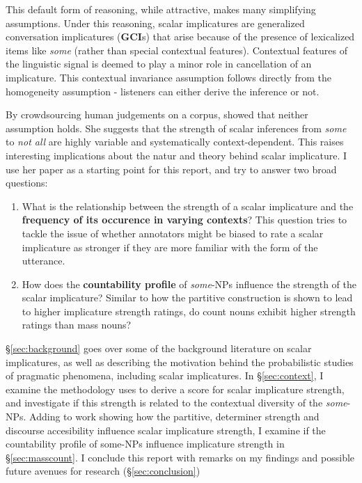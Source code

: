 \documentclass[10pt, biblatex, linguex]{report}
\begin{document}
This default form of reasoning, while attractive, makes many simplifying
assumptions. Under this reasoning, scalar implicatures are generalized
conversation implicatures (\textbf{GCI}s) that arise because of the presence of
lexicalized items like \textit{some} (rather than special contextual features).
Contextual features of the linguistic signal is
deemed to play a minor role in cancellation of an implicature. This {\rmsc
contextual invariance} assumption follows directly from the {\rmsc homogeneity}
assumption - listeners can either derive the inference or not.


By crowdsourcing human judgements on a corpus, \citet{degen_investigating_2015}
showed that neither assumption holds. She
suggests that the strength of scalar inferences from \textit{some} to
\textit{not all} are highly variable and systematically context-dependent. This
raises interesting implications about the natur and theory behind scalar
implicature. I use her paper as a starting point for this report, and try to
answer two broad questions:

\begin{enumerate}
    \item What is the relationship between the strength of a scalar implicature
          and the \textbf{frequency of its occurence in varying contexts}? This question
          tries to tackle the issue of whether annotators might be biased to
          rate a scalar implicature as stronger if they are more familiar with
          the form of the utterance.
    \item How does the \textbf{countability profile} of \textit{some}-NPs influence
          the strength of the scalar implicature? Similar to how the partitive
          construction is shown to lead to higher implicature strength ratings,
          do count nouns exhibit higher strength ratings than mass nouns?
\end{enumerate}

\S\ref{sec:background} goes over some of the background literature on scalar
implicatures, as well as describing the motivation behind the probabilistic
studies of pragmatic phenomena, including scalar implicatures. In \S\ref{sec:context},
I examine the methodology \citeauthor{degen_investigating_2015} uses to derive
a score for scalar implicature strength, and investigate if this strength is
related to the contextual diversity of the \textit{some}-NPs. Adding to
 work showing
how the partitive, determiner strength and discourse accesibility influence
scalar implicature strength, I examine if the countability profile of some-NPs
influence implicature strength in \S\ref{sec:masscount}. I conclude this report
with remarks on my findings and possible future avenues for research
(\S\ref{sec:conclusion})
\end{document}
